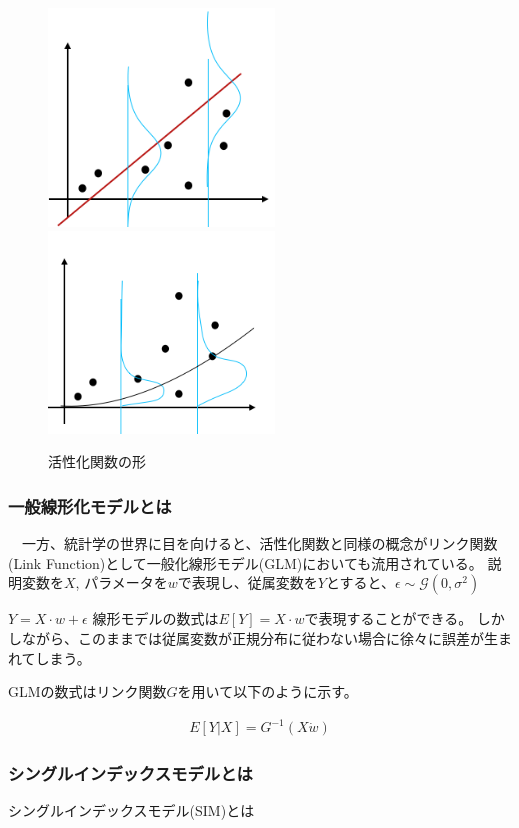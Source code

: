 \begin{figure}[hbtp]
        \includegraphics[width=6cm]{asset/glm1.png}~~~~~ ~~~~~ 
        \includegraphics[width=6cm]{asset/glm2.png}
            \caption{活性化関数の形}
            \label{neural_network1}
\end{figure}

\subsubsection{一般線形化モデルとは}
　一方、統計学の世界に目を向けると、活性化関数と同様の概念がリンク関数(Link Function)として一般化線形モデル(GLM)においても流用されている。
説明変数を$ X $, パラメータを$ w $で表現し、従属変数を$ Y $とすると、$ \epsilon \sim \mathcal{G}(0, \sigma^2) $

$ Y = X \cdot w + \epsilon $
線形モデルの数式は$ E[Y] = X\cdot w $で表現することができる。
しかしながら、このままでは従属変数が正規分布に従わない場合に徐々に誤差が生まれてしまう。

GLMの数式はリンク関数$ G $を用いて以下のように示す。

\begin{eqnarray}
E[Y|X]=G^{-1} (X\dot w)
\end{eqnarray}

\subsubsection{シングルインデックスモデルとは}
シングルインデックスモデル(SIM)とは

